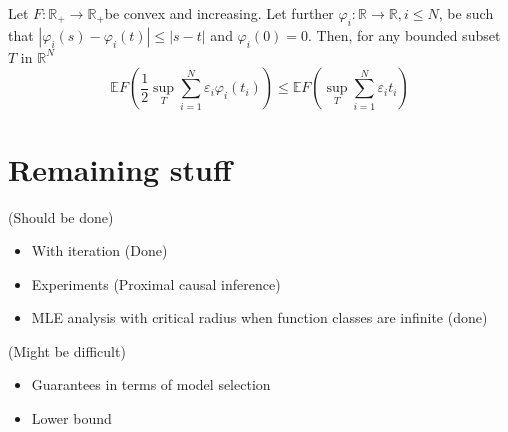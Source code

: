 \documentclass[12pt]{extarticle} %
\begin{document}
\begin{lemma}\label{contr}
    Let $F: \mathbb{R}_{+} \rightarrow \mathbb{R}_{+}$be convex and increasing. Let further $\varphi_i: \mathbb{R} \rightarrow \mathbb{R}, i \leq N$, be such that $|\varphi_i(s) - \varphi_i(t)|\leq |s-t|$ and $\varphi_i(0)=0$. Then, for any bounded subset $T$ in $\mathbb{R}^N$
    $$
    \mathbb{E} F\left(\frac{1}{2}\sup_{T}\sum_{i=1}^N \varepsilon_i \varphi_i\left(t_i\right)\right) \leq \mathbb{E} F\left(\sup_{T}\sum_{i=1}^N \varepsilon_i t_i\right)
    $$
\end{lemma}


\section{Remaining stuff}

(Should be done) 
\begin{itemize}
    \item With iteration (Done)
    \item Experiments (Proximal causal inference) 
    \item MLE analysis with critical radius when function classes are infinite  (done)
\end{itemize}

(Might be difficult)
\begin{itemize}
    \item Guarantees in terms of model selection 
    \item Lower bound 
\end{itemize}



\end{document}
